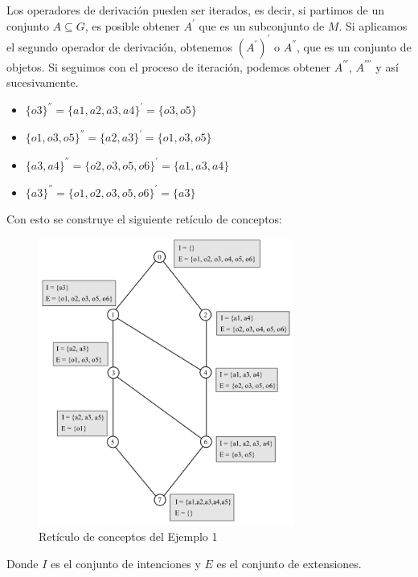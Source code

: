 \documentclass[../../main.tex]{subfiles}
\begin{document}
Los operadores de derivación pueden ser iterados, es decir, si partimos de un conjunto $A \subseteq G$, es posible obtener $A^{'}$ que es un subconjunto de $M$. Si aplicamos el segundo operador de derivación, obtenemos $(A^{'})^{'}$ o $A^{''}$, que es un conjunto de objetos. Si seguimos con el proceso de iteración, podemos obtener $A^{'''}$, $A^{''''}$ y así sucesivamente.

\begin{itemize}
    \item $\{ o3 \}^{''} = \{ a1,a2,a3,a4 \}^{'} = \{ o3, o5 \}$ 
    \item $\{ o1,o3,o5 \}^{''} = \{ a2,a3 \}^{'} = \{ o1,o3,o5 \}$  
    \item $\{ a3,a4 \}^{''} = \{ o2,o3,o5,o6 \}^{'} = \{ a1,a3,a4 \}$ 
    \item $\{ a3 \}^{''} = \{ o1,o2,o3,o5,o6 \}^{'} = \{ a3 \}$ 
\end{itemize}

Con esto se construye el siguiente retículo de conceptos:
\begin{figure}[H]
\centering
\includegraphics[width=0.75\textwidth]{images/fca/reticulo1.png}
\caption{Retículo de conceptos del Ejemplo 1}
\end{figure}

Donde $I$ es el conjunto de intenciones y $E$ es el conjunto de extensiones.
\end{document}
